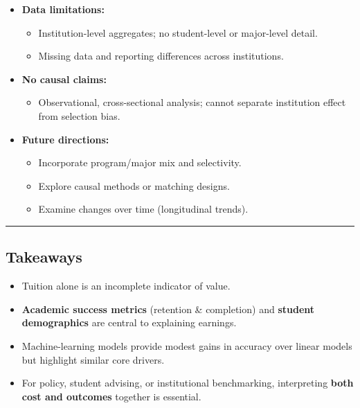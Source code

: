 \documentclass[
  letterpaper,
  DIV=11,
  numbers=noendperiod]{scrartcl}
\providecommand{\tightlist}{%
  \setlength{\itemsep}{0pt}\setlength{\parskip}{0pt}}
\begin{document}
\begin{itemize}
\tightlist
\item
  \textbf{Data limitations:}

  \begin{itemize}
  \tightlist
  \item
    Institution-level aggregates; no student-level or major-level
    detail.
  \item
    Missing data and reporting differences across institutions.
  \end{itemize}
\item
  \textbf{No causal claims:}

  \begin{itemize}
  \tightlist
  \item
    Observational, cross-sectional analysis; cannot separate institution
    effect from selection bias.
  \end{itemize}
\item
  \textbf{Future directions:}

  \begin{itemize}
  \tightlist
  \item
    Incorporate program/major mix and selectivity.
  \item
    Explore causal methods or matching designs.
  \item
    Examine changes over time (longitudinal trends).
  \end{itemize}
\end{itemize}

\begin{center}\rule{0.5\linewidth}{0.5pt}\end{center}

\subsection{Takeaways}\label{takeaways}

\begin{itemize}
\tightlist
\item
  Tuition alone is an incomplete indicator of value.
\item
  \textbf{Academic success metrics} (retention \& completion) and
  \textbf{student demographics} are central to explaining earnings.
\item
  Machine-learning models provide modest gains in accuracy over linear
  models but highlight similar core drivers.
\item
  For policy, student advising, or institutional benchmarking,
  interpreting \textbf{both cost and outcomes} together is essential.
\end{itemize}
\end{document}
